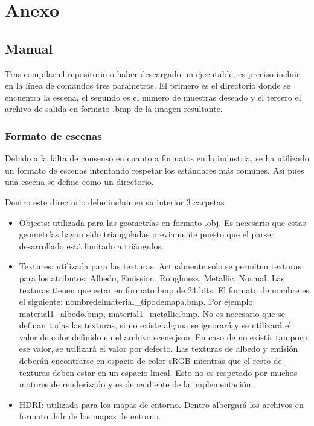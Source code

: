 \chapter{Anexo}
	
\section{Manual}
	
Tras compilar el repositorio o haber descargado un ejecutable, es preciso incluir en la línea de comandos tres parámetros. El primero es el directorio donde se encuentra la escena, el segundo es el número de muestras deseado y el tercero el archivo de salida en formato .bmp de la imagen resultante.
	
\subsection{Formato de escenas}
\label{sceneformat}

Debido a la falta de consenso en cuanto a formatos en la industria, se ha utilizado un formato de escenas intentando respetar los estándares más comunes. Así pues una escena se define como un directorio.

Dentro este directorio debe incluir en su interior 3 carpetas

\begin{itemize}
	\item Objects: utilizada para las geometrías en formato .obj. Es necesario que estas geometrías hayan sido trianguladas previamente puesto que el parser desarrollado está limitado a triángulos.
	
	\item Textures: utilizada para las texturas. Actualmente solo se permiten texturas para los atributos: Albedo, Emission, Roughness, Metallic, Normal. Las texturas tienen que estar en formato bmp de 24 bits. El formato de nombre es el siguiente: nombredelmaterial\_tipodemapa.bmp. Por ejemplo: material1\_albedo.bmp, material1\_metallic.bmp. No es necesario que se definan todas las texturas, si no existe alguna se ignorará y se utilizará el valor de color definido en el archivo scene.json. En caso de no existir tampoco ese valor, se utilizará el valor por defecto. Las texturas de albedo y emisión deberán encontrarse en espacio de color sRGB mientras que el resto de texturas deben estar en un espacio lineal. Esto no es respetado por muchos motores de renderizado y es dependiente de la implementación.
	
	\item HDRI: utilizada para los mapas de entorno. Dentro albergará los archivos en formato .hdr de los mapas de entorno.
\end{itemize}

